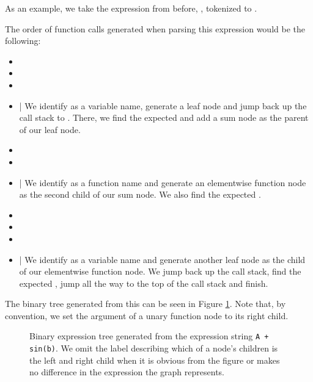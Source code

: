 \documentclass[12pt, a4paper]{report}
\begin{document}
As an example, we take the expression from before, , tokenized to .

The order of function calls generated when parsing this expression would be the following:
\FloatBarrier
\begin{itemize}
    \setlength\itemsep{0.01em}
    \item {}
    \item {}
    \item {}
    \item {} | We identify  as a variable name, generate a leaf node and jump back up the call stack to . There, we find the expected  and add a sum node as the parent of our leaf node.
    \item {}
    \item {}
    \item {} | We identify  as a function name and generate an elementwise function node as the second child of our sum node. We also find the expected .
    \item {}
    \item {}
    \item {}
    \item {} | We identify  as a variable name and generate another leaf node as the child of our elementwise function node. We jump back up the call stack, find the expected , jump all the way to the top of the call stack and finish.
\end{itemize}
\FloatBarrier
The binary tree generated from this can be seen in Figure \ref{fig:tree_example}.
Note that, by convention, we set the argument of a unary function node to its right child.

\begin{figure}
    \centering
    \caption[Example of Binary Tree Generated from an Expression]{Binary expression tree generated from the expression string \texttt{A + sin(b)}. We omit the label describing which of a node's children is the left and right child when it is obvious from the figure or makes no difference in the expression the graph represents.}
    \label{fig:tree_example}
\end{figure}
\end{document}
